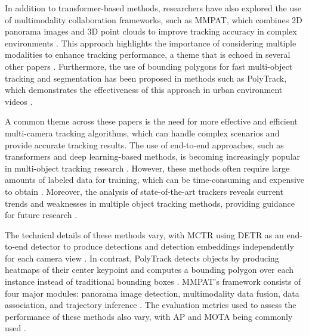 \documentclass[conference]{IEEEtran}
\begin{document}
In addition to transformer-based methods, researchers have also explored the use of multimodality collaboration frameworks, such as MMPAT, which combines 2D panorama images and 3D point clouds to improve tracking accuracy in complex environments \cite{Know Your Surroundings: Panoramic Multi-Object Tracking by Multimodality Collaboration}. This approach highlights the importance of considering multiple modalities to enhance tracking performance, a theme that is echoed in several other papers \cite{Tracking the Trackers: An Analysis of the State of the Art in Multiple Object Tracking}. Furthermore, the use of bounding polygons for fast multi-object tracking and segmentation has been proposed in methods such as PolyTrack, which demonstrates the effectiveness of this approach in urban environment videos \cite{PolyTrack: Tracking with Bounding Polygons}.

A common theme across these papers is the need for more effective and efficient multi-camera tracking algorithms, which can handle complex scenarios and provide accurate tracking results. The use of end-to-end approaches, such as transformers and deep learning-based methods, is becoming increasingly popular in multi-object tracking research \cite{MCTR: Multi Camera Tracking Transformer}. However, these methods often require large amounts of labeled data for training, which can be time-consuming and expensive to obtain \cite{Challenge of Multi-Camera Tracking}. Moreover, the analysis of state-of-the-art trackers reveals current trends and weaknesses in multiple object tracking methods, providing guidance for future research \cite{Tracking the Trackers: An Analysis of the State of the Art in Multiple Object Tracking}.

The technical details of these methods vary, with MCTR using DETR as an end-to-end detector to produce detections and detection embeddings independently for each camera view \cite{MCTR: Multi Camera Tracking Transformer}. In contrast, PolyTrack detects objects by producing heatmaps of their center keypoint and computes a bounding polygon over each instance instead of traditional bounding boxes \cite{PolyTrack: Tracking with Bounding Polygons}. MMPAT's framework consists of four major modules: panorama image detection, multimodality data fusion, data association, and trajectory inference \cite{Know Your Surroundings: Panoramic Multi-Object Tracking by Multimodality Collaboration}. The evaluation metrics used to assess the performance of these methods also vary, with AP and MOTA being commonly used \cite{Tracking the Trackers: An Analysis of the State of the Art in Multiple Object Tracking}.
\end{document}
